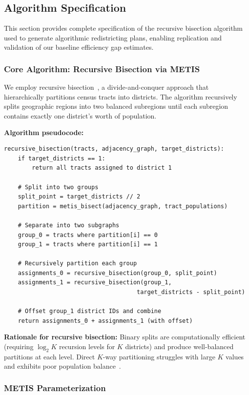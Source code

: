\subsection{Algorithm Specification}
\label{sec:algorithm-spec}

This section provides complete specification of the recursive bisection algorithm used to generate algorithmic redistricting plans, enabling replication and validation of our baseline efficiency gap estimates.

\subsubsection{Core Algorithm: Recursive Bisection via METIS}

We employ recursive bisection~\cite{karypis1998metis,deluca2026recursive}, a divide-and-conquer approach that hierarchically partitions census tracts into districts. The algorithm recursively splits geographic regions into two balanced subregions until each subregion contains exactly one district's worth of population.

\textbf{Algorithm pseudocode:}
\begin{verbatim}
recursive_bisection(tracts, adjacency_graph, target_districts):
    if target_districts == 1:
        return all tracts assigned to district 1

    # Split into two groups
    split_point = target_districts // 2
    partition = metis_bisect(adjacency_graph, tract_populations)

    # Separate into two subgraphs
    group_0 = tracts where partition[i] == 0
    group_1 = tracts where partition[i] == 1

    # Recursively partition each group
    assignments_0 = recursive_bisection(group_0, split_point)
    assignments_1 = recursive_bisection(group_1,
                                      target_districts - split_point)

    # Offset group_1 district IDs and combine
    return assignments_0 + assignments_1 (with offset)
\end{verbatim}

\textbf{Rationale for recursive bisection:} Binary splits are computationally efficient (requiring $\log_2 K$ recursion levels for $K$ districts) and produce well-balanced partitions at each level. Direct $K$-way partitioning struggles with large $K$ values and exhibits poor population balance~\cite{karypis1998metis}.

\subsubsection{METIS Parameterization}

